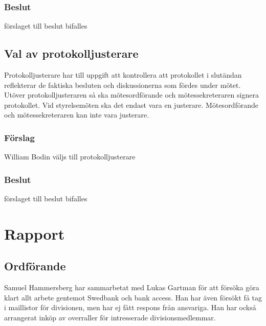 \documentclass[protokoll]{dvd}
\begin{document}
\subsubsection*{Beslut}
\begin{attsatser}
    \item förslaget till beslut bifalles
\end{attsatser}

\subsection{Val av protokolljusterare}

Protokolljusterare har till uppgift att kontrollera att protokollet i slutändan reflekterar de faktiska besluten och diskussionerna som fördes under mötet.
Utöver protokolljusteraren så ska mötesordförande och mötessekreteraren signera protokollet.
Vid styrelsemöten ska det endast vara en justerare.
Mötesordförande och mötessekreteraren kan inte vara justerare.

\subsubsection*{Förslag}
\begin{attsatser}
    \item William Bodin väljs till protokolljusterare
\end{attsatser}
\subsubsection*{Beslut}
\begin{attsatser}
    \item förslaget till beslut bifalles
\end{attsatser}

\section{Rapport}
\subsection{Ordförande}
Samuel Hammersberg har sammarbetat med Lukas Gartman för att försöka göra klart allt arbete gentemot Swedbank och bank access.
Han har även försökt få tag i maillistor för divisionen, men har ej fått respons från ansvariga.
Han har också arrangerat inköp av overraller för intresserade divisionsmedlemmar. 
\end{document}
